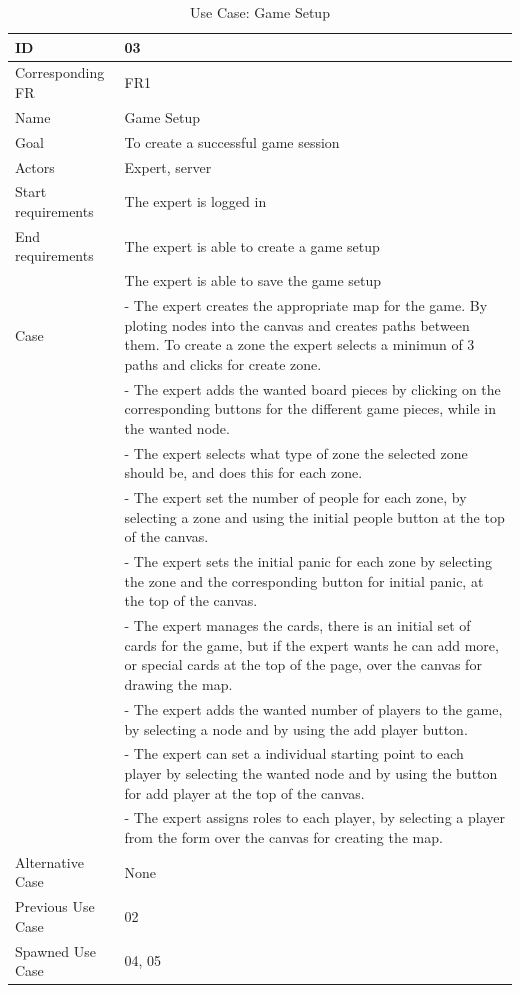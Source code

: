 \begin{table}[H]
\begin{tabular}{|l|p{14cm}|} \hline
	\textbf{ID} & \textbf{03}\\ \hline
	Corresponding FR & FR1\\ \hline
	Name & Game Setup\\ \hline
	Goal & To create a successful game session\\ \hline
	Actors & Expert, server\\ \hline
	Start requirements & The expert is logged in\\ \hline
	End requirements & The expert is able to create a game setup \\ 
						& The expert is able to save the game setup\\ \hline
	Case & - The expert creates the appropriate map for the game. By ploting nodes into the canvas
			and creates paths between them. To create a zone the expert selects a minimun of 3 paths and clicks for create zone.\\
			& - The expert adds the wanted board pieces by clicking on the corresponding buttons for the different game pieces, while in the wanted node. \\
			& - The expert selects what type of zone the selected zone should be, and does this for each zone.\\
			& - The expert set the number of people for each zone, by selecting a zone and using the initial people button at the top of the canvas.\\
			& - The expert sets the initial panic for each zone by selecting the zone and the corresponding button for initial panic, at the top of the canvas.\\
			& - The expert manages the cards, there is an initial set of cards for the game, but if the expert wants he can add more, or special cards at the top of the page, over the canvas for drawing the map.\\
			& - The expert adds the wanted number of players to the game, by selecting a node and by using the add player button.\\
			& - The expert can set a individual starting point to each player by selecting the wanted node and by using the button for add player at the top of the canvas.\\
			& - The expert assigns roles to each player, by selecting a player from the form over the canvas for creating the map. \\
			 \hline
	Alternative Case & None \\ \hline
	Previous Use Case & 02\\ \hline
	Spawned Use Case & 04, 05\\ \hline
\end{tabular}
\caption{Use Case: Game Setup}
\label{fig:usecase03table}
\end{table}


